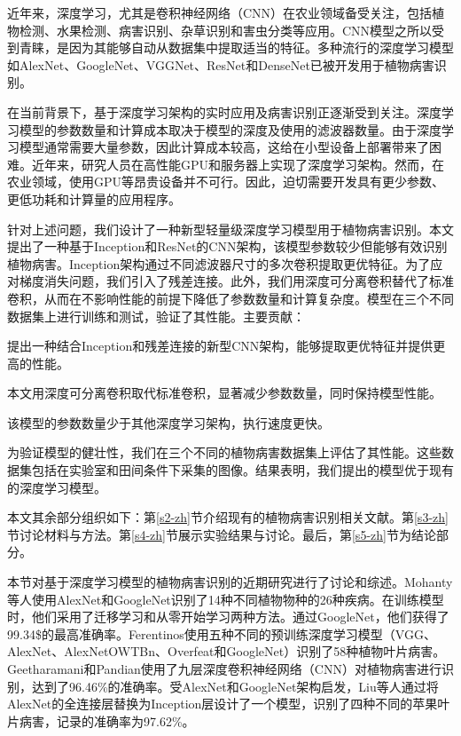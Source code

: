 近年来，深度学习，尤其是卷积神经网络（CNN）在农业领域备受关注，包括植物检测、水果检测、病害识别、杂草识别和害虫分类等应用。CNN模型之所以受到青睐，是因为其能够自动从数据集中提取适当的特征。多种流行的深度学习模型如AlexNet、GoogleNet、VGGNet、ResNet和DenseNet已被开发用于植物病害识别。

在当前背景下，基于深度学习架构的实时应用及病害识别正逐渐受到关注。深度学习模型的参数数量和计算成本取决于模型的深度及使用的滤波器数量。由于深度学习模型通常需要大量参数，因此计算成本较高，这给在小型设备上部署带来了困难。近年来，研究人员在高性能GPU和服务器上实现了深度学习架构。然而，在农业领域，使用GPU等昂贵设备并不可行。因此，迫切需要开发具有更少参数、更低功耗和计算量的应用程序。

针对上述问题，我们设计了一种新型轻量级深度学习模型用于植物病害识别。本文提出了一种基于Inception和ResNet的CNN架构，该模型参数较少但能够有效识别植物病害。Inception架构通过不同滤波器尺寸的多次卷积提取更优特征。为了应对梯度消失问题，我们引入了残差连接。此外，我们用深度可分离卷积替代了标准卷积，从而在不影响性能的前提下降低了参数数量和计算复杂度。模型在三个不同数据集上进行训练和测试，验证了其性能。主要贡献：

提出一种结合Inception和残差连接的新型CNN架构，能够提取更优特征并提供更高的性能。

本文用深度可分离卷积取代标准卷积，显著减少参数数量，同时保持模型性能。

该模型的参数数量少于其他深度学习架构，执行速度更快。

为验证模型的健壮性，我们在三个不同的植物病害数据集上评估了其性能。这些数据集包括在实验室和田间条件下采集的图像。结果表明，我们提出的模型优于现有的深度学习模型。

本文其余部分组织如下：第\ref{s2-zh}节介绍现有的植物病害识别相关文献。第\ref{s3-zh}节讨论材料与方法。第\ref{s4-zh}节展示实验结果与讨论。最后，第\ref{s5-zh}节为结论部分。

本节对基于深度学习模型的植物病害识别的近期研究进行了讨论和综述。Mohanty等人使用AlexNet和GoogleNet识别了14种不同植物物种的26种疾病。在训练模型时，他们采用了迁移学习和从零开始学习两种方法。通过GoogleNet，他们获得了99.34\$的最高准确率。Ferentinos使用五种不同的预训练深度学习模型（VGG、AlexNet、AlexNetOWTBn、Overfeat和GoogleNet）识别了58种植物叶片病害。Geetharamani和Pandian使用了九层深度卷积神经网络（CNN）对植物病害进行识别，达到了96.46\%的准确率。受AlexNet和GoogleNet架构启发，Liu等人通过将AlexNet的全连接层替换为Inception层设计了一个模型，识别了四种不同的苹果叶片病害，记录的准确率为97.62\%。

